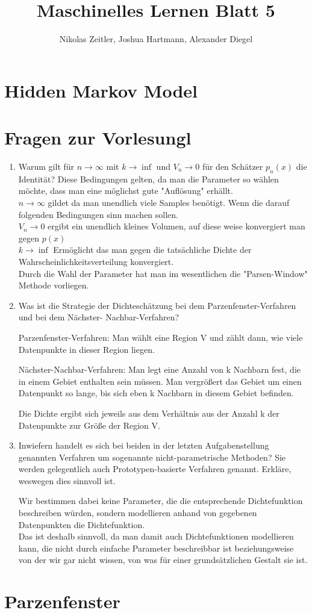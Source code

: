 \documentclass[a4paper]{scrartcl}
\author{Nikolas Zeitler, Joshua Hartmann, Alexander Diegel}
\title{Maschinelles Lernen Blatt 5}
\begin{document}
\maketitle
\section{Hidden Markov Model}
\section{Fragen zur Vorlesungl}
\begin{enumerate}
	\item Warum gilt für $n\rightarrow\infty$ mit $k\rightarrow\inf$ und $V_n \rightarrow 0$ für den Schätzer $p_n(x)$ die Identität?
	Diese Bedingungen gelten, da man die Parameter so wählen möchte, dass man eine möglichst gute "Auflösung" erhällt. \\
	$n\rightarrow\infty$ gildet da man unendlich viele Samples benötigt. Wenn die darauf folgenden Bedingungen sinn machen sollen. \\
	$V_n \rightarrow 0$ ergibt ein unendlich kleines Volumen, auf diese weise konvergiert man gegen $p(x)$\\
	$k\rightarrow\inf$ Ermöglicht das man gegen die tatsächliche Dichte der Wahrscheinlichkeitsverteilung konvergiert. \\
	Durch die Wahl der Parameter hat man im wesentlichen die "Parsen-Window" Methode vorliegen.  
		
	\item Was ist die Strategie der Dichteschätzung bei dem Parzenfenster-Verfahren und bei dem Nächster-
	Nachbar-Verfahren?
	
	Parzenfenster-Verfahren: Man wählt eine Region V und zählt dann, wie viele Datenpunkte in dieser Region liegen.
	
	Nächster-Nachbar-Verfahren: Man legt eine Anzahl von k Nachbarn fest, die in einem Gebiet enthalten sein müssen. Man vergrößert das Gebiet um einen Datenpunkt so lange, bis sich eben k Nachbarn in diesem Gebiet befinden.
	
	Die Dichte ergibt sich jeweils aus dem Verhältnis aus der Anzahl k der Datenpunkte zur Größe der Region V.
	
	\item Inwiefern handelt es sich bei beiden in der letzten Aufgabenstellung genannten Verfahren um
	sogenannte nicht-parametrische Methoden? Sie werden gelegentlich auch Prototypen-basierte
	Verfahren genannt. Erkläre, weswegen dies sinnvoll ist.
	
	Wir bestimmen dabei keine Parameter, die die entsprechende Dichtefunktion beschreiben würden, sondern modellieren anhand von gegebenen Datenpunkten die Dichtefunktion.\\
	Das ist deshalb sinnvoll, da man damit auch Dichtefunktionen modellieren kann, die nicht durch einfache Parameter beschreibbar ist beziehungsweise von der wir gar nicht wissen, von was für einer grundsätzlichen Gestalt sie ist.
\end{enumerate}

\section{Parzenfenster}
\end{document}
